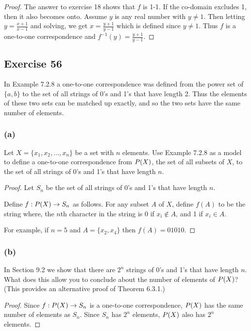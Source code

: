 \documentclass[14pt]{extarticle}
\let\mathscr\relax
\newcommand{\ps}{\mathscr{P}} %
\begin{document}
\begin{proof}
    The answer to exercise 18 shows that $f$ is 1-1. If the co-domain excludes 1, then it also becomes onto. Assume $y$ is
    any real number with \(y \neq 1\). Then letting \(y = \frac{x+1}{x-1}\) and solving, we get \(x=\frac{y+1}{y-1}\)
    which is defined since \(y \neq 1\). Thus $f$ is a one-to-one correspondence and \(f^{-1}(y) = \frac{y+1}{y-1}\).
\end{proof}

\subsection{Exercise 56}
In Example 7.2.8 a one-to-one correspondence was defined from the power set of $\{a, b\}$ to the set of all strings
of 0’s and 1’s that have length 2. Thus the elements of these two sets can be matched up exactly, and so the two
sets have the same number of elements.

\subsubsection{(a)}
Let \(X = \{x_1, x_2 , \ldots, x_n\}\) be a set with $n$ elements. Use Example 7.2.8 as a model to define a
one-to-one correspondence from \(\ps(X)\), the set of all subsets of $X$, to the set of all strings of 0’s and 1’s
that have length $n$.

\begin{proof}
    Let $S_n$ be the set of all strings of 0's and 1's that have length $n$.

    Define \(f : \ps(X) \to S_n\) as follows. For any subset $A$ of $X$, define $f(A)$ to be the string where, the $n$th
    character in the string is 0 if \(x_i \notin A\), and 1 if \(x_i \in A\).

    For example, if $n=5$ and \(A = \{x_2, x_4\}\) then \(f(A) = 01010\).
\end{proof}

\subsubsection{(b)}
In Section 9.2 we show that there are $2^n$ strings of 0’s and 1’s that have length $n$. What does this allow you to
conclude about the number of elements of $\ps(X)$? (This provides an alternative proof of Theorem 6.3.1.)

\begin{proof}
    Since \(f: \ps(X) \to S_n\) is a one-to-one correspondence, \(\ps(X)\) has the same number of elements as \(S_n\).
    Since \(S_n\) has $2^n$ elements, $\ps(X)$ also has $2^n$ elements.
\end{proof}
\end{document}
